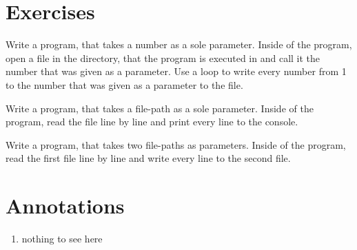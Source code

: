 \documentclass{dcbl/challenge}
\begin{document}
\section*{Exercises}
\begin{aufgabe}
    Write a program, that takes a number as a sole parameter.
    Inside of the program, open a file in the directory, that the program is executed in and call it the number that was given as a parameter.
    Use a loop to write every number from 1 to the number that was given as a parameter to the file.
\end{aufgabe}

\begin{aufgabe}
    Write a program, that takes a file-path as a sole parameter.
    Inside of the program, read the file line by line and print every line to the console.
\end{aufgabe}

\begin{aufgabe}
    Write a program, that takes two file-paths as parameters.
    Inside of the program, read the first file line by line and write every line to the second file.
\end{aufgabe}


\section*{Annotations}
\begin{enumerate}
    \item nothing to see here
\end{enumerate}
\end{document}
